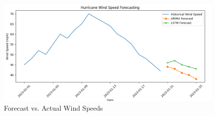 \begin{figure}[H]
	\centering
	\includegraphics[width=\textwidth]{Images/Output.png}
	\caption{Forecast vs. Actual Wind Speeds}
	\label{fig:forecast_output}
\end{figure}




